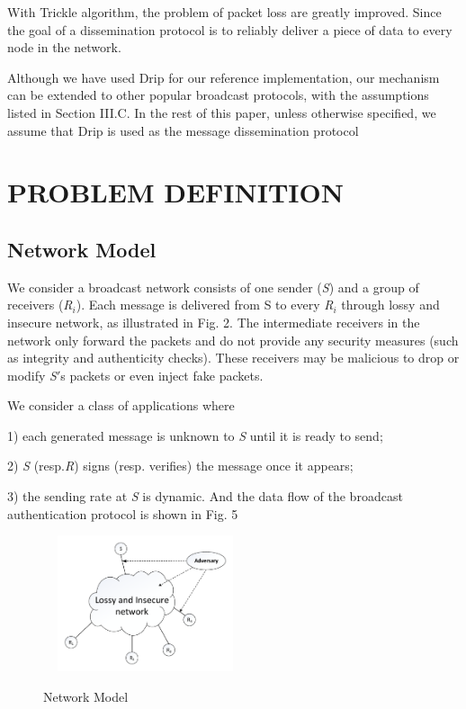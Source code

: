 \documentclass{sig-alternate-05-2015}
\begin{document}
With Trickle algorithm, the problem of packet loss are greatly improved. Since the goal of a dissemination protocol is to reliably deliver a piece of data to every node in the network.
	
	Although we have used Drip for our reference implementation, our mechanism can be extended to other popular broadcast protocols, with the assumptions listed in Section III.C. In the rest of this paper, unless otherwise specified, we assume that Drip is used as the message dissemination protocol

\section{ PROBLEM DEFINITION}
\subsection{Network Model}
	We consider a broadcast network consists of one sender (\emph{S}) and a group of receivers (\emph{R$_i$}). Each message is delivered from S to every \emph{R$_i$} through lossy and insecure network, as illustrated in Fig. 2. The intermediate receivers in the network only forward the packets and do not provide any security measures (such as integrity and authenticity checks). These receivers may be malicious to drop or modify \emph{S}$'$s packets or even inject fake packets.
	
	We consider a class of applications where
	
	1) each generated message is unknown to \emph{S} until it is ready to send; 
	
	2) \emph{S} (resp.\emph{R}) signs (resp. verifies) the message once it appears; 
	
	3) the sending rate at \emph{S} is dynamic. And the data flow of the broadcast authentication protocol is shown in Fig. 5
	
	
\begin{figure}
\centering
\includegraphics[width=6cm,height=4cm]{NetworkModel.pdf}\\
\caption{Network Model}\label{} 
\end{figure}
\end{document}
